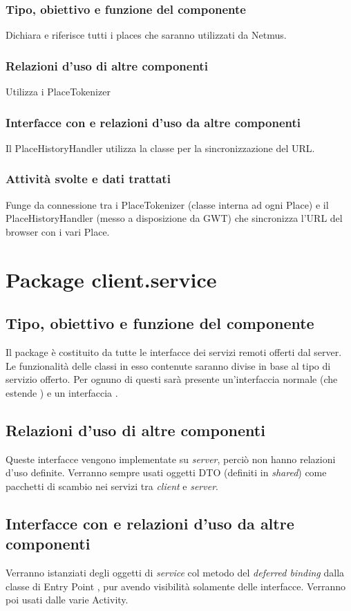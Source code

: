 \subsubsection*{Tipo, obiettivo e funzione del componente}
Dichiara e riferisce tutti i places che saranno utilizzati da Netmus.
\subsubsection*{Relazioni d'uso di altre componenti}
Utilizza i PlaceTokenizer
\subsubsection*{Interfacce con e relazioni d'uso da altre componenti}
Il PlaceHistoryHandler utilizza la classe per la sincronizzazione del URL.
\subsubsection*{Attivit\`a svolte e dati trattati}
Funge da connessione tra i PlaceTokenizer (classe interna ad ogni Place) e il
PlaceHistoryHandler (messo a disposizione da GWT) che sincronizza l'URL del
browser con i vari Place.

\newpage
\section{Package client.service} %
\subsection*{Tipo, obiettivo e funzione del componente}
Il package  \`e costituito da tutte le interfacce dei servizi remoti
offerti dal server. Le funzionalit\`a delle classi in esso contenute saranno
divise in base al tipo di servizio offerto.  Per ognuno di questi sar\`a
presente un'interfaccia normale (che estende ) e un
interfaccia .

\subsection*{Relazioni d'uso di altre componenti}
Queste interfacce vengono implementate su \emph{server}, perci\`o non
hanno relazioni d'uso definite. Verranno sempre usati oggetti DTO (definiti in
\emph{shared}) come pacchetti di scambio nei servizi tra \emph{client} e
\emph{server}.

\subsection*{Interfacce con e relazioni d'uso da altre componenti}
Verranno istanziati degli oggetti di \emph{service} col metodo del
\emph{deferred binding} dalla classe di Entry Point , pur avendo
visibilit\`a solamente delle interfacce. Verranno poi usati dalle varie Activity.

